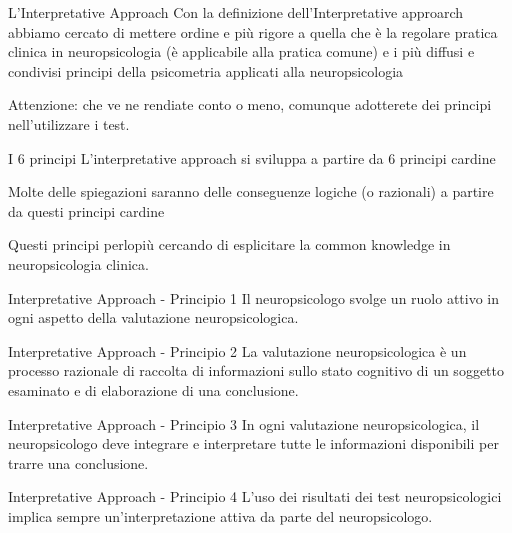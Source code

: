 \documentclass[
  ignorenonframetext,
  aspectratio=169,
]{beamer}
\begin{document}
\begin{frame}{L'Interpretative Approach}
\label{linterpretative-approach-1}
Con la definizione dell'Interpretative approarch abbiamo cercato di
mettere ordine e più rigore a quella che è la regolare pratica clinica
in neuropsicologia (è applicabile alla pratica comune) e i più diffusi e
condivisi principi della psicometria applicati alla neuropsicologia

Attenzione: che ve ne rendiate conto o meno, comunque adotterete dei
principi nell'utilizzare i test.
\end{frame}

\begin{frame}{I 6 principi}
\label{i-6-principi}
L'interpretative approach si sviluppa a partire da 6 principi cardine

Molte delle spiegazioni saranno delle conseguenze logiche (o razionali)
a partire da questi principi cardine

Questi principi perlopiù cercando di esplicitare la common knowledge in
neuropsicologia clinica.
\end{frame}

\begin{frame}{Interpretative Approach - Principio 1}
\label{interpretative-approach---principio-1}
Il neuropsicologo svolge un ruolo attivo in ogni aspetto della
valutazione neuropsicologica.
\end{frame}

\begin{frame}{Interpretative Approach - Principio 2}
\label{interpretative-approach---principio-2}
La valutazione neuropsicologica è un processo razionale di raccolta di
informazioni sullo stato cognitivo di un soggetto esaminato e di
elaborazione di una conclusione.
\end{frame}

\begin{frame}{Interpretative Approach - Principio 3}
\label{interpretative-approach---principio-3}
In ogni valutazione neuropsicologica, il neuropsicologo deve integrare e
interpretare tutte le informazioni disponibili per trarre una
conclusione.
\end{frame}

\begin{frame}{Interpretative Approach - Principio 4}
\label{interpretative-approach---principio-4}
L'uso dei risultati dei test neuropsicologici implica sempre
un'interpretazione attiva da parte del neuropsicologo.
\end{frame}
\end{document}

